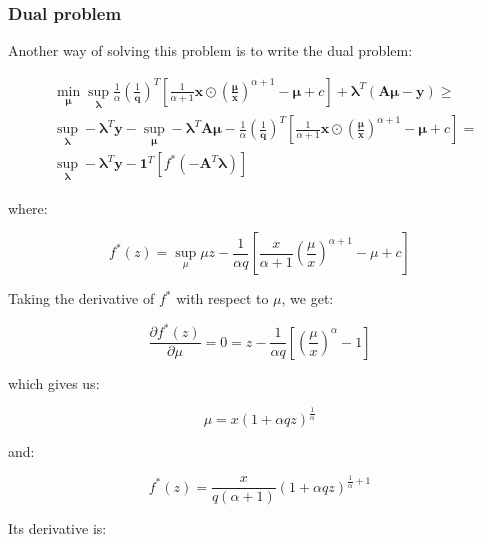 \documentclass{tex/note}
\begin{document}
\subsubsection{Dual problem}

Another way of solving this problem is to write the dual problem:

\begin{align*}
& \min_{\bm{\mu}} \sup_{\bm{\lambda}} \frac{1}{\alpha} \left( \frac{1}{\bm{q}} \right)^T \left[ \frac{1}{\alpha + 1} \bm{x} \odot \left( \frac{\bm{\mu}}{\bm{x}} \right) ^{\alpha + 1} - \bm{\mu} + c \right] + \bm{\lambda}^T \left( \bm{A} \bm{\mu} - \bm{y} \right) \geq \\
& \sup_{\bm{\lambda}} - \bm{\lambda}^T \bm{y} - \sup_{\bm{\mu}} - \bm{\lambda}^T \bm{A} \bm{\mu} - \frac{1}{\alpha} \left( \frac{1}{\bm{q}} \right)^T \left[ \frac{1}{\alpha + 1} \bm{x} \odot \left( \frac{\bm{\mu}}{\bm{x}} \right) ^{\alpha + 1} - \bm{\mu} + c \right] = \\
& \sup_{\bm{\lambda}} - \bm{\lambda}^T \bm{y} -  \bm{1}^T \left[ f^* \left( - \bm{A}^T \bm{\lambda} \right) \right]
\end{align*}

where:

\begin{equation*}
f^* \left( z \right) = \sup_{\mu} \mu z - \frac{1}{\alpha q} \left[ \frac{x}{\alpha + 1} \left( \frac{\mu}{x} \right) ^{\alpha + 1} - \mu + c \right]
\end{equation*}

Taking the derivative of $f^*$ with respect to $\mu$, we get:

\begin{equation*}
\frac{\partial f^* \left( z \right)}{\partial \mu} = 0 = z - \frac{1}{\alpha q} \left[ \left( \frac{\mu}{x} \right)^{\alpha} - 1 \right]
\end{equation*}

which gives us:

\begin{equation*}
\mu = x \left( 1 + \alpha q z \right)^{\frac{1}{\alpha}}
\end{equation*}

and:

\begin{equation*}
f^* \left( z \right) = \frac{x}{q \left( \alpha + 1 \right)} \left( 1 + \alpha q z \right)^{\frac{1}{\alpha} + 1}
\end{equation*}

Its derivative is:
\end{document}
